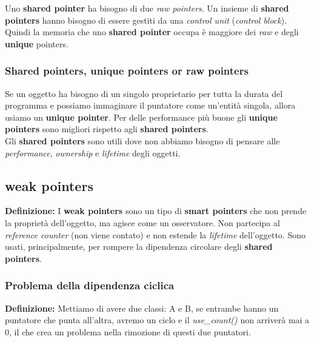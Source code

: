 \textsf{\small Uno \textbf{shared pointer} ha bisogno di due \emph{raw pointers}. Un insieme di \textbf{shared pointers} hanno bisogno di essere gestiti da una \emph{control unit} (\emph{control block}). Quindi la memoria che uno \textbf{shared pointer} occupa è maggiore dei \emph{raw} e degli \textbf{unique} pointers.} \\

\subsubsection{Shared pointers, unique pointers or raw pointers}

\textsf{\small Se un oggetto ha bisogno di un singolo proprietario per tutta la durata del programma e possiamo immaginare il puntatore come un'entità singola, allora usiamo un \textbf{unique pointer}. Per delle performance più buone gli \textbf{unique pointers} sono migliori rispetto agli \textbf{shared pointers}.} \\

\textsf{\small Gli \textbf{shared pointers} sono utili dove non abbiamo bisogno di pensare alle \emph{performance}, \emph{ownership} e \emph{lifetime} degli oggetti.}

\subsection{weak pointers}

\textsf{\small \textbf{Definizione: } I \textbf{weak pointers} sono un tipo di \textbf{smart pointers} che non prende la proprietà dell'oggetto, ma agisce come un osservatore. Non partecipa al \emph{reference counter} (non viene contato) e non estende la \emph{lifetime} dell'oggetto. Sono usati, principalmente, per rompere la dipendenza circolare degli \textbf{shared pointers}.} \\

\subsubsection{Problema della dipendenza ciclica}

\textsf{\small \textbf{Definizione: } Mettiamo di avere due classi: A e B, se entrambe hanno un puntatore che punta all'altra, avremo un ciclo e il \emph{use\_count()} non arriverà mai a 0, il che crea un problema nella rimozione di questi due puntatori.} \\

